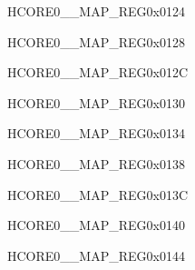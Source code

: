 \begin{register}{H}{CORE0\_\_MAP\_REG}{0x0124}\label{regdesc:CORE0KMINTMAPREG}
\end{register}\vspace{-3em}

\begin{register}{H}{CORE0\_\_MAP\_REG}{0x0128}\label{regdesc:CORE0GPIOINT0MAPREG}
\end{register}\vspace{-3em}


\begin{register}{H}{CORE0\_\_MAP\_REG}{0x012C}\label{regdesc:CORE0GPIOINT1MAPREG}
\end{register}\vspace{-3em}


\begin{register}{H}{CORE0\_\_MAP\_REG}{0x0130}\label{regdesc:CORE0GPIOINT2MAPREG}
\end{register}\vspace{-3em}


\begin{register}{H}{CORE0\_\_MAP\_REG}{0x0134}\label{regdesc:CORE0GPIOINT3MAPREG}
\end{register}\vspace{-3em}


\begin{register}{H}{CORE0\_\_MAP\_REG}{0x0138}\label{regdesc:CORE0GPIOPADCOMPINTMAPREG}
\end{register}\vspace{-3em}


\begin{register}{H}{CORE0\_\_MAP\_REG}{0x013C}\label{regdesc:CORE0CPUINTFROMCPU0MAPREG}
\end{register}\vspace{-3em}


\begin{register}{H}{CORE0\_\_MAP\_REG}{0x0140}\label{regdesc:CORE0CPUINTFROMCPU1MAPREG}
\end{register}\vspace{-3em}


\begin{register}{H}{CORE0\_\_MAP\_REG}{0x0144}\label{regdesc:CORE0CPUINTFROMCPU2MAPREG}
\end{register}\vspace{-3em}


